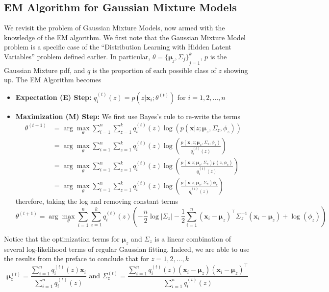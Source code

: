 \subsection{EM Algorithm for Gaussian Mixture Models}
We revisit the problem of Gaussian Mixture Models, now armed with the knowledge of the EM algorithm. We first note that the Gaussian Mixture Model problem is a specific case of the ``Distribution Learning with Hidden Latent Variables'' problem defined earlier. In particular, $\theta={\{\boldsymbol{\mu}_j,\Sigma_j\}}_{j=1}^k$, $p$ is the Gaussian Mixture pdf, and $q$ is the proportion of each possible class of $z$ showing up. The EM Algorithm becomes
\begin{itemize}
    \item \textbf{Expectation (E) Step:} $q_i^{(t)}(z)=p(z|\mathbf{x}_i;\theta^{(t)})$ for $i=1,2,\dots,n$
    \item \textbf{Maximization (M) Step:} We first use Bayes's rule to re-write the terms
    \begin{align*}
        \theta^{(t+1)} 
        &= \arg\max_{\theta} \sum_{i=1}^n \sum_{z=1}^k q_i^{(t)}(z) \log(p(\mathbf{x}|z;\boldsymbol{\mu}_z,\Sigma_z,\phi_z)) \\
        &= \arg\max_{\theta} \sum_{i=1}^n \sum_{z=1}^k q_i^{(t)}(z) \log\left(\frac{p(\mathbf{x},z;\boldsymbol{\mu}_z,\Sigma_z,\phi_z)}{q_i^{(t)}(z)}\right) \\
        &= \arg\max_{\theta} \sum_{i=1}^n \sum_{z=1}^k q_i^{(t)}(z) \log\left(\frac{p(\mathbf{x}|z;\boldsymbol{\mu}_z,\Sigma_z)p(z,\phi_z)}{q_i^{(t)}(z)}\right) \\
        &= \arg\max_{\theta} \sum_{i=1}^n \sum_{z=1}^k q_i^{(t)}(z) \log\left(\frac{p(\mathbf{x}|z;\boldsymbol{\mu}_z,\Sigma_z)\phi_z}{q_i^{(t)}(z)}\right)
    \end{align*}
    therefore, taking the log and removing constant terms
    \[
        \theta^{(t+1)} = \arg\max_{\theta} \sum_{i=1}^n \sum_{z=1}^k q_i^{(t)}(z) 
        \left(
            -\frac{n}{2} \log |\Sigma_z|
            - \frac{1}{2} \sum_{i=1}^n (\mathbf{x}_i - \boldsymbol{\mu}_z)^\top \Sigma_z^{-1} (\mathbf{x}_i - \boldsymbol{\mu}_z)
            + \log(\phi_z)
        \right)
    \]
\end{itemize}
Notice that the optimization terms for $\boldsymbol{\mu}_z$ and $\Sigma_z$ is a linear combination of several log-likelihood terms of regular Gaussian fitting. Indeed, we are able to use the results from the preface to conclude that for $z=1,2,\dots,k$
\[
\boldsymbol{\mu}_z^{(t)} = \frac{\sum_{i=1}^n q_i^{(t)}(z) \mathbf{x}_i}{\sum_{i=1}^n q_i^{(t)}(z)}
\text{ and }
\Sigma_z^{(t)}  = \frac{\sum_{i=1}^n q_i^{(t)}(z) (\mathbf{x}_i-\boldsymbol{\mu}_z)(\mathbf{x}_i-\boldsymbol{\mu}_z)^\top}{\sum_{i=1}^n q_i^{(t)}(z)}
\]
